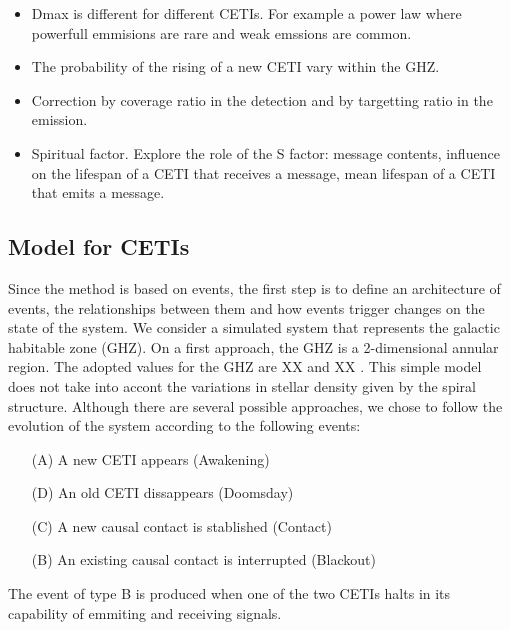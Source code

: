 \documentclass[crop]{CSLB}%
\begin{document}
\begin{itemize}
   \item Dmax is different for different CETIs.  For example a power
      law where powerfull emmisions are rare and weak emssions are
      common.
   \item The probability of the rising of a new CETI vary within the
      GHZ.
   \item Correction by coverage ratio in the detection and by
      targetting ratio in the emission.
   \item Spiritual factor.  Explore the role of the S factor: message
      contents, influence on the lifespan of a CETI that receives a
      message, mean lifespan of a CETI that emits a message.
\end{itemize}


\subsection{Model for CETIs}


Since the method is based on events, the first step is to define an
architecture of events, the relationships between them and how events
trigger changes on the state of the system.
%
We consider a simulated system that represents the galactic habitable
zone (GHZ).
%
On a first approach, the GHZ is a 2-dimensional annular region.
%
The adopted values for the GHZ are XX and XX \citep{Lineweaver2004}.
%
This simple model does not take into accont the variations in stellar
density given by the spiral structure.
%
Although there are several possible approaches, we chose to follow the
evolution of the system according to the following events:

\begin{enumerate}
   \item[(A)] A new CETI appears (Awakening)
   \item[(D)] An old CETI dissappears (Doomsday)
   \item[(C)] A new causal contact is stablished (Contact)
   \item[(B)] An existing causal contact is interrupted (Blackout)
\end{enumerate}

The event of type B is produced when one of the two CETIs halts in its
capability of emmiting and receiving signals.



\end{document}
